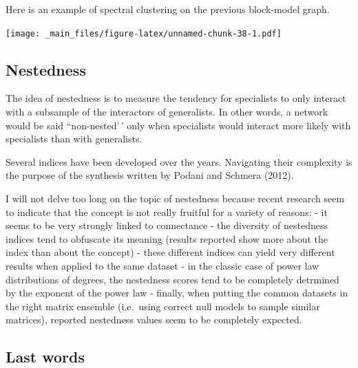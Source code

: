 \documentclass[
]{book}
\newenvironment{Shaded}{\begin{snugshade}}{\end{snugshade}}
\newcommand{\AttributeTok}[1]{\textcolor[rgb]{0.13,0.29,0.53}{#1}}
\newcommand{\DecValTok}[1]{\textcolor[rgb]{0.00,0.00,0.81}{#1}}
\newcommand{\FunctionTok}[1]{\textcolor[rgb]{0.13,0.29,0.53}{\textbf{#1}}}
\newcommand{\NormalTok}[1]{#1}
\newcommand{\OtherTok}[1]{\textcolor[rgb]{0.56,0.35,0.01}{#1}}
\newcommand{\SpecialCharTok}[1]{\textcolor[rgb]{0.81,0.36,0.00}{\textbf{#1}}}
\newcommand{\StringTok}[1]{\textcolor[rgb]{0.31,0.60,0.02}{#1}}
\theoremstyle{definition}
\theoremstyle{definition}
\theoremstyle{definition}
\theoremstyle{definition}
\theoremstyle{remark}
\begin{document}
Here is an example of spectral clustering on the previous block-model graph.

\begin{Shaded}
\end{Shaded}

\texttt{[image: \_main\_files/figure-latex/unnamed-chunk-38-1.pdf]}

\subsection{Nestedness}\label{nestedness}

The idea of nestedness is to measure the tendency for specialists to only interact with a subsample of the interactors of generalists. In other words, a network would be said ``non-nested'\,' only when specialists would interact more likely with specialists than with generalists.

Several indices have been developed over the years. Navigating their complexity is the purpose of the synthesis written by Podani and Schmera (2012).

I will not delve too long on the topic of nestedness because recent research seem to indicate that the concept is not really fruitful for a variety of reasons:
- it seems to be very strongly linked to connectance
- the diversity of nestedness indices tend to obfuscate its meaning (results reported show more about the index than about the concept)
- these different indices can yield very different results when applied to the same dataset
- in the classic case of power law distributions of degrees, the nestedness scores tend to be completely detrmined by the exponent of the power law
- finally, when putting the common datasets in the right matrix ensemble (i.e.~using correct null models to sample similar matrices), reported nestedness values seem to be completely expected.

\subsection{Last words}\label{last-words}
\end{document}
